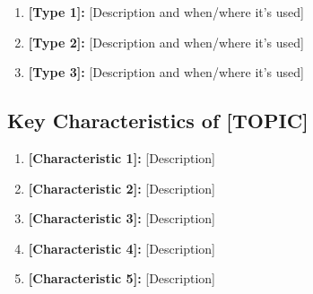 \documentclass[12pt,letterpaper]{article}
\begin{document}
\begin{enumerate}[label=\arabic*.]
  \item \textbf{[Type 1]:} [Description and when/where it's used]
  \item \textbf{[Type 2]:} [Description and when/where it's used]
  \item \textbf{[Type 3]:} [Description and when/where it's used]
\end{enumerate}


\subsection{Key Characteristics of [TOPIC]}

\begin{enumerate}
  \item \textbf{[Characteristic 1]:} [Description]
  \item \textbf{[Characteristic 2]:} [Description]
  \item \textbf{[Characteristic 3]:} [Description]
  \item \textbf{[Characteristic 4]:} [Description]
  \item \textbf{[Characteristic 5]:} [Description]
\end{enumerate}

\begin{example}
\end{example}

\begin{solution}
\end{solution}

\end{document}
